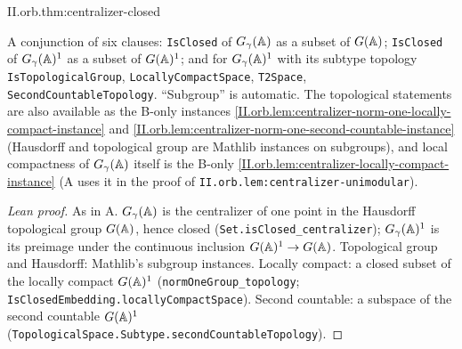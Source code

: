 \begin{theorem}[closedness]
\end{theorem}
\begin{tfformal}{II.orb.thm:centralizer-closed}
\begin{tffidelity}
A conjunction of six clauses: \texttt{IsClosed} of $G_\gamma(\mathbb{A})$ as a subset of $G(\mathbb{A})$; \texttt{IsClosed} of $G_\gamma(\mathbb{A})^1$ as a subset of $G(\mathbb{A})^1$; and for $G_\gamma(\mathbb{A})^1$ with its subtype topology \texttt{IsTopologicalGroup}, \texttt{LocallyCompactSpace}, \texttt{T2Space}, \texttt{SecondCountableTopology}. ``Subgroup'' is automatic. The topological statements are also available as the B-only instances \cref{II.orb.lem:centralizer-norm-one-locally-compact-instance} and \cref{II.orb.lem:centralizer-norm-one-second-countable-instance} (Hausdorff and topological group are Mathlib instances on subgroups), and local compactness of $G_\gamma(\mathbb{A})$ itself is the B-only \cref{II.orb.lem:centralizer-locally-compact-instance} (A uses it in the proof of \texttt{II.orb.lem:centralizer-unimodular}).
\end{tffidelity}
\end{tfformal}
\begin{proof}[Lean proof]
As in A. $G_\gamma(\mathbb{A})$ is the centralizer of one point in the Hausdorff topological group $G(\mathbb{A})$, hence closed (\texttt{Set.isClosed\_centralizer}); $G_\gamma(\mathbb{A})^1$ is its preimage under the continuous inclusion $G(\mathbb{A})^1\to G(\mathbb{A})$. Topological group and Hausdorff: Mathlib's subgroup instances. Locally compact: a closed subset of the locally compact $G(\mathbb{A})^1$ (\texttt{normOneGroup\_topology}; \texttt{IsClosedEmbedding.locallyCompactSpace}). Second countable: a subspace of the second countable $G(\mathbb{A})^1$ (\texttt{TopologicalSpace.Subtype.secondCountableTopology}).
\end{proof}

